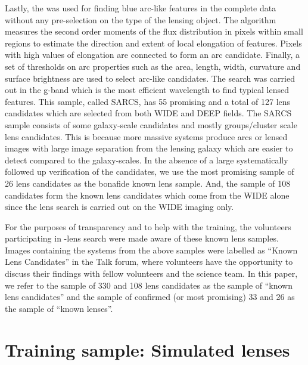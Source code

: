 \documentclass[useAMS,usenatbib,a4paper]{mn2e}
\begin{document}
Lastly, the \af \citep{More2012} was used for finding blue arc-like features in
the complete \cfhtls data without any pre-selection on the type of the lensing
object. The algorithm measures the second order moments of the flux distribution
in pixels within small regions to estimate the direction and extent of local
elongation of features. Pixels with high values of elongation are connected to
form an arc candidate. Finally, a set of thresholds on arc properties such as
the area, length, width, curvature and surface brightness are used to select
arc-like candidates. The search was carried out in the g-band which is the most
efficient wavelength to find typical lensed features.  This sample, called
SARCS, has 55 promising and a total of 127 lens candidates which are selected
from both \cfhtls WIDE and DEEP fields. The SARCS sample consists of some
galaxy-scale candidates and mostly groups/cluster scale lens candidates. This is
because more massive systems produce arcs or lensed images with large image
separation from the lensing galaxy which are easier to detect compared to the
galaxy-scales.  In the absence of a large systematically followed up
verification of the candidates, we use the  most promising sample of 26 lens
candidates as the bonafide known lens sample. And, the sample of 108 candidates
form the known lens candidates which come from the \cfhtls WIDE alone since the
\sw lens search is carried out on the WIDE imaging only.


For the purposes of transparency and to help with the training,
the volunteers participating in \sw-\cfhtls lens search were made aware of
these known lens samples. Images containing the systems from the above samples
were labelled as ``Known Lens Candidates'' in the Talk forum, where volunteers
have the opportunity to discuss their findings with fellow volunteers and the
science team. In this paper, we refer to the sample of 330 \rf and 108
\af lens candidates as the sample of ``known lens candidates'' and the sample of
confirmed (or most promising) 33 \rf and 26 \af as the sample of
``known lenses''.




\section{Training sample: Simulated lenses}
\label{sec:ts}
\end{document}
